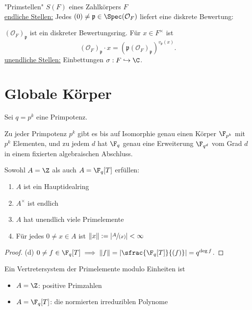 \begin{bemerkungnr}
    "Primstellen" $S(F)$ eines Zahlkörpers $F$\\
    \underline{endliche Stellen:} Jedes $(0) \ne \mathfrak{p} \in \Spec(\mathcal{O}_F)$ liefert eine diskrete Bewertung:

    $(\mathcal{O}_F)_\mathfrak{p}$ ist ein diskreter Bewertungsring. Für $x \in F^\times$ ist 
    $$ (\mathcal{O}_F)_\mathfrak{p}\cdot x = (\mathfrak{p}(\mathcal{O}_F)_\mathfrak{p})^{v_\mathfrak{p}(x)}.$$
    \underline{unendliche Stellen:} Einbettungen $\sigma: F \hookrightarrow \C$.
\end{bemerkungnr}

\section{Globale Körper}
Sei $q = p^k$ eine Primpotenz.

\begin{erinnerungnr}
    Zu jeder Primpotenz $p^k$ gibt es bis auf Isomorphie genau einen Körper $\F_{p^k}$ mit $p^k$ Elementen, und zu jedem $d$ hat
    $\F_q$ genau eine Erweiterung $\F_{q^d}$ vom Grad $d$ in einem fixierten algebraischen Abschluss.
\end{erinnerungnr}

\begin{satz}
    Sowohl $A = \Z$ als auch $A = \F_q[T]$ erfüllen:
    \begin{enumerate}[label=(\alph*)]
        \item $A$ ist ein Hauptidealring
        \item $A^\times$ ist endlich
        \item $A$ hat unendlich viele Primelemente
        \item Für jedes $0 \ne x \in A$ ist $\|x\|:= |\sfrac{A}{(x)}| < \infty$ 
    \end{enumerate}
\end{satz}
\begin{proof}
    (d) $0 \ne f \in \F_q[T] \implies \|f\| = | \sfrac{\F_q[T]}{(f)} | = q^{\deg f}$.
\end{proof}
\begin{bemerkungnr}
    Ein Vertretersystem der Primelemente modulo Einheiten ist
    \begin{itemize}
        \item $A = \Z$: positive Primzahlen
        \item $A = \F_q[T]$: die normierten irreduziblen Polynome
    \end{itemize}
\end{bemerkungnr}

